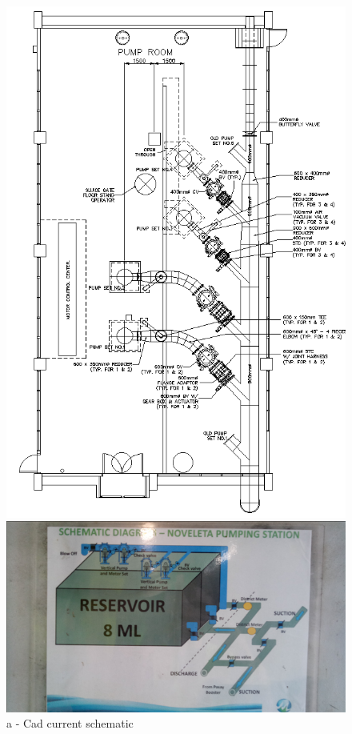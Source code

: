 \begin{figure} [!htb]
	\begin{minipage}[b]{0.3\linewidth}
		\centering
		\includegraphics[width=\textwidth]{figures/fig_ch043_pumplayout_cad}
		\caption*{a - Cad current schematic }
	\end{minipage}
	\hspace{0.05cm}
	\begin{minipage}[b]{0.3\linewidth}
		\centering
		\includegraphics[width=\textwidth]{figures/fig_ch043_plant_layout1}

\end{minipage}
\end{figure}
